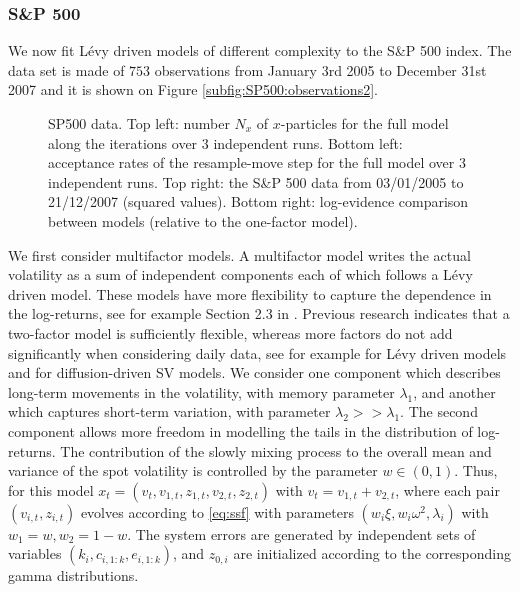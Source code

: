 \documentclass{statsoc}
\begin{document}


\subsubsection{S\&P 500}

We now fit  L\'evy driven models of different complexity to
the S\&P 500 index. The data set 
is made of $753$ observations from January 3rd 2005 to December 31st
2007 and it is shown on Figure
\ref{subfig:SP500:observations2}. 

 \begin{figure}[H]
  \centering
  \caption{\label{fig:SP500:observations} SP500 data. Top left: number $N_x$ of $x$-particles 
for the full model along the iterations over $3$
    independent runs. Bottom left: acceptance
    rates of the resample-move step for the full model over $3$
    independent runs. Top right: the S\&P 500 data from
    03/01/2005 to 21/12/2007 (squared values).  Bottom right:   log-evidence comparison between
    models (relative to the one-factor model). }
 \end{figure}

We first consider multifactor models. A multifactor model writes the
actual volatility as a sum of 
independent components each of which follows a L\'evy driven
model. These models have more flexibility to capture the dependence in
the log-returns, 
see for example Section 2.3 in \cite{bns:real}. Previous research
indicates that a two-factor model is sufficiently flexible, whereas
more factors do not add significantly when considering daily data, see
for example \cite{bns:real,grif:steel:ou} for L\'evy driven models and
\cite{chernov:multi} for diffusion-driven SV models.  We consider one
component which  describes long-term movements in the
volatility, with memory parameter $\lambda_1$, and another which
captures short-term variation,  with parameter 
$\lambda_2 >> \lambda_1$. The second component allows more freedom in
modelling the tails in the distribution of log-returns. The contribution of the slowly mixing
process to the overall mean and variance of the spot volatility is
controlled by the parameter $w \in (0,1)$. 
Thus, for this model
$x_t=(v_t,v_{1,t},z_{1,t},v_{2,t},z_{2,t})$ with
$v_t=v_{1,t}+v_{2,t}$, where each pair $(v_{i,t},z_{i,t})$ evolves
according to  \eqref{eq:ssf} with parameters $(w_i \xi,w_i 
\omega^2,\lambda_i)$ with $w_1=w, w_2=1-w$. The system errors are 
generated by independent sets of variables
$(k_i,c_{i,1:k},e_{i,1:k})$, and $z_{0,i}$ are initialized according
to the corresponding gamma distributions. 
\end{document}
